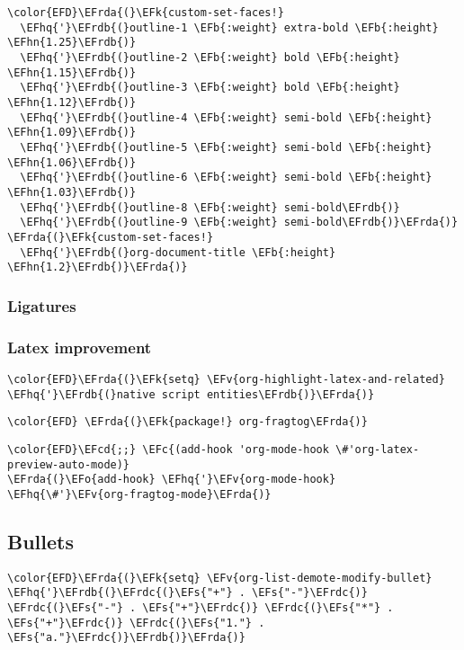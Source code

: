 \documentclass[12pt]{article}
\theoremstyle{plain}%
\theoremstyle{definition}
\theoremstyle{remark}
\newcommand{\EFc}[1]{\textcolor{EFc}{#1}} %
\newcommand{\EFcd}[1]{\textcolor{EFcd}{#1}} %
\newcommand{\EFs}[1]{\textcolor{EFs}{#1}} %
\newcommand{\EFk}[1]{\textcolor{EFk}{#1}} %
\newcommand{\EFb}[1]{\textcolor{EFb}{#1}} %
\newcommand{\EFv}[1]{\textcolor{EFv}{#1}} %
\newcommand{\EFo}[1]{\textcolor{EFo}{#1}} %
\newcommand{\EFhn}[1]{\textcolor{EFhn}{\textbf{#1}}} %
\newcommand{\EFhq}[1]{\textcolor{EFhq}{#1}} %
\newcommand{\EFrda}[1]{\textcolor{EFrda}{#1}} %
\newcommand{\EFrdb}[1]{\textcolor{EFrdb}{#1}} %
\newcommand{\EFrdc}[1]{\textcolor{EFrdc}{#1}} %
\begin{document}
\begin{Code}
\begin{Verbatim}
\color{EFD}\EFrda{(}\EFk{custom-set-faces!}
  \EFhq{'}\EFrdb{(}outline-1 \EFb{:weight} extra-bold \EFb{:height} \EFhn{1.25}\EFrdb{)}
  \EFhq{'}\EFrdb{(}outline-2 \EFb{:weight} bold \EFb{:height} \EFhn{1.15}\EFrdb{)}
  \EFhq{'}\EFrdb{(}outline-3 \EFb{:weight} bold \EFb{:height} \EFhn{1.12}\EFrdb{)}
  \EFhq{'}\EFrdb{(}outline-4 \EFb{:weight} semi-bold \EFb{:height} \EFhn{1.09}\EFrdb{)}
  \EFhq{'}\EFrdb{(}outline-5 \EFb{:weight} semi-bold \EFb{:height} \EFhn{1.06}\EFrdb{)}
  \EFhq{'}\EFrdb{(}outline-6 \EFb{:weight} semi-bold \EFb{:height} \EFhn{1.03}\EFrdb{)}
  \EFhq{'}\EFrdb{(}outline-8 \EFb{:weight} semi-bold\EFrdb{)}
  \EFhq{'}\EFrdb{(}outline-9 \EFb{:weight} semi-bold\EFrdb{)}\EFrda{)}
\EFrda{(}\EFk{custom-set-faces!}
  \EFhq{'}\EFrdb{(}org-document-title \EFb{:height} \EFhn{1.2}\EFrdb{)}\EFrda{)}
\end{Verbatim}
\end{Code}
\subsubsection{Ligatures}
\label{sec:org2aac5dc}
\subsubsection{Latex improvement}
\label{sec:orgdfaeaad}
\begin{Code}
\begin{Verbatim}
\color{EFD}\EFrda{(}\EFk{setq} \EFv{org-highlight-latex-and-related} \EFhq{'}\EFrdb{(}native script entities\EFrdb{)}\EFrda{)}
\end{Verbatim}
\end{Code}
\begin{Code}
\begin{Verbatim}
\color{EFD} \EFrda{(}\EFk{package!} org-fragtog\EFrda{)}
\end{Verbatim}
\end{Code}
\begin{Code}
\begin{Verbatim}
\color{EFD}\EFcd{;;} \EFc{(add-hook 'org-mode-hook \#'org-latex-preview-auto-mode)}
\EFrda{(}\EFo{add-hook} \EFhq{'}\EFv{org-mode-hook} \EFhq{\#'}\EFv{org-fragtog-mode}\EFrda{)}
\end{Verbatim}
\end{Code}
\subsection{Bullets}
\label{sec:org1b095f6}
\begin{Code}
\begin{Verbatim}
\color{EFD}\EFrda{(}\EFk{setq} \EFv{org-list-demote-modify-bullet} \EFhq{'}\EFrdb{(}\EFrdc{(}\EFs{"+"} . \EFs{"-"}\EFrdc{)} \EFrdc{(}\EFs{"-"} . \EFs{"+"}\EFrdc{)} \EFrdc{(}\EFs{"*"} . \EFs{"+"}\EFrdc{)} \EFrdc{(}\EFs{"1."} . \EFs{"a."}\EFrdc{)}\EFrdb{)}\EFrda{)}
\end{Verbatim}
\end{Code}
\end{document}
